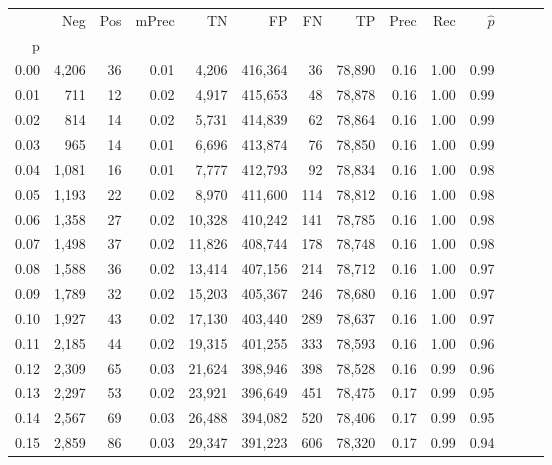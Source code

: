 \begin{tabular}{rrrrrrrrrrrrrr}
\toprule
{} &    Neg &    Pos & mPrec &       TN &       FP &      FN &      TP &  Prec &   Rec & $\hat{p}$ \\
p    &        &        &       &          &          &         &         &       &       &           \\
\midrule
0.00 &  4,206 &     36 &  0.01 &    4,206 &  416,364 &      36 &  78,890 &  0.16 &  1.00 &      0.99 \\
0.01 &    711 &     12 &  0.02 &    4,917 &  415,653 &      48 &  78,878 &  0.16 &  1.00 &      0.99 \\
0.02 &    814 &     14 &  0.02 &    5,731 &  414,839 &      62 &  78,864 &  0.16 &  1.00 &      0.99 \\
0.03 &    965 &     14 &  0.01 &    6,696 &  413,874 &      76 &  78,850 &  0.16 &  1.00 &      0.99 \\
0.04 &  1,081 &     16 &  0.01 &    7,777 &  412,793 &      92 &  78,834 &  0.16 &  1.00 &      0.98 \\
0.05 &  1,193 &     22 &  0.02 &    8,970 &  411,600 &     114 &  78,812 &  0.16 &  1.00 &      0.98 \\
0.06 &  1,358 &     27 &  0.02 &   10,328 &  410,242 &     141 &  78,785 &  0.16 &  1.00 &      0.98 \\
0.07 &  1,498 &     37 &  0.02 &   11,826 &  408,744 &     178 &  78,748 &  0.16 &  1.00 &      0.98 \\
0.08 &  1,588 &     36 &  0.02 &   13,414 &  407,156 &     214 &  78,712 &  0.16 &  1.00 &      0.97 \\
0.09 &  1,789 &     32 &  0.02 &   15,203 &  405,367 &     246 &  78,680 &  0.16 &  1.00 &      0.97 \\
0.10 &  1,927 &     43 &  0.02 &   17,130 &  403,440 &     289 &  78,637 &  0.16 &  1.00 &      0.97 \\
0.11 &  2,185 &     44 &  0.02 &   19,315 &  401,255 &     333 &  78,593 &  0.16 &  1.00 &      0.96 \\
0.12 &  2,309 &     65 &  0.03 &   21,624 &  398,946 &     398 &  78,528 &  0.16 &  0.99 &      0.96 \\
0.13 &  2,297 &     53 &  0.02 &   23,921 &  396,649 &     451 &  78,475 &  0.17 &  0.99 &      0.95 \\
0.14 &  2,567 &     69 &  0.03 &   26,488 &  394,082 &     520 &  78,406 &  0.17 &  0.99 &      0.95 \\
0.15 &  2,859 &     86 &  0.03 &   29,347 &  391,223 &     606 &  78,320 &  0.17 &  0.99 &      0.94 \\

\end{tabular}
